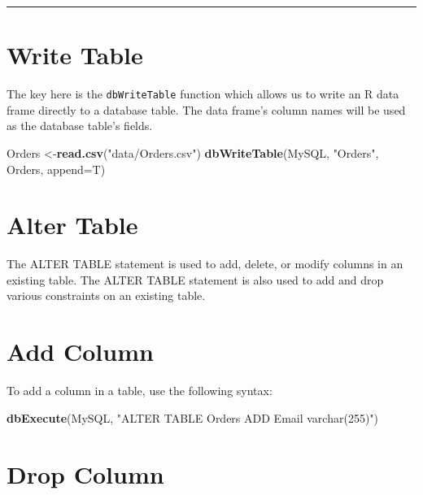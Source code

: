 \documentclass[
]{book}
\newenvironment{Shaded}{\begin{snugshade}}{\end{snugshade}}
\newcommand{\AttributeTok}[1]{\textcolor[rgb]{0.13,0.29,0.53}{#1}}
\newcommand{\FunctionTok}[1]{\textcolor[rgb]{0.13,0.29,0.53}{\textbf{#1}}}
\newcommand{\NormalTok}[1]{#1}
\newcommand{\OtherTok}[1]{\textcolor[rgb]{0.56,0.35,0.01}{#1}}
\newcommand{\StringTok}[1]{\textcolor[rgb]{0.31,0.60,0.02}{#1}}
\begin{document}
\begin{center}\rule{0.5\linewidth}{0.5pt}\end{center}

\hypertarget{write-table}{%
\section{Write Table}\label{write-table}}

The key here is the \texttt{dbWriteTable} function which allows us to write an R data frame directly to a database table. The data frame's column names will be used as the database table's fields.

\begin{Shaded}
\begin{Highlighting}[]
\NormalTok{Orders      }\OtherTok{\textless{}{-}}\FunctionTok{read.csv}\NormalTok{(}\StringTok{"data/Orders.csv"}\NormalTok{)  }
\FunctionTok{dbWriteTable}\NormalTok{(MySQL, }\StringTok{"Orders"}\NormalTok{, Orders, }\AttributeTok{append=}\NormalTok{T) }
\end{Highlighting}
\end{Shaded}

\hypertarget{alter-table}{%
\section{Alter Table}\label{alter-table}}

The ALTER TABLE statement is used to add, delete, or modify columns in an existing table. The ALTER TABLE statement is also used to add and drop various constraints on an existing table.

\hypertarget{add-column}{%
\section{Add Column}\label{add-column}}

To add a column in a table, use the following syntax:

\begin{Shaded}
\begin{Highlighting}[]
\FunctionTok{dbExecute}\NormalTok{(MySQL, }\StringTok{"ALTER TABLE Orders}
\StringTok{                 ADD Email varchar(255)"}\NormalTok{)}
\end{Highlighting}
\end{Shaded}

\hypertarget{drop-column}{%
\section{Drop Column}\label{drop-column}}
\end{document}
